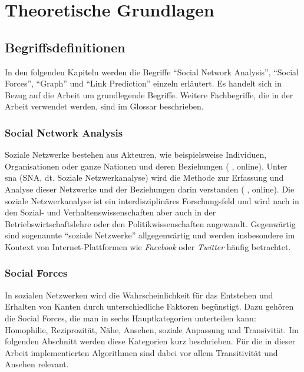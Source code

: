 \chapter{Theoretische Grundlagen}

\section{Begriffsdefinitionen}
In den folgenden Kapiteln werden die Begriffe ``Social Network Analysis'', ``Social Forces'', ``Graph'' und ``Link Prediction'' einzeln
erläutert. Es handelt sich in Bezug auf die Arbeit um grundlegende Begriffe. Weitere Fachbegriffe, die
in der Arbeit verwendet werden, sind im Glossar beschrieben.

\subsection{Social Network Analysis}
Soziale Netzwerke bestehen aus Akteuren, wie beispielsweise Individuen, Organisationen oder ganze Nationen und deren Beziehungen (\citeauthor{ulrike_baumol_soziale_2019} \citeyear{ulrike_baumol_soziale_2019}, online).
Unter \acl{sna} (SNA, dt. Soziale Netzwerkanalyse) wird die Methode zur Erfassung und Analyse dieser Netzwerke und der Beziehungen darin verstanden (\citeauthor{wikipedia_soziale_2019} \citeyear{wikipedia_soziale_2019}, online).
Die soziale Netzwerkanalyse ist ein interdisziplinäres Forschungsfeld und wird nach \cite{ulrike_baumol_soziale_2019} in den Sozial- und Verhaltenswissenschaften aber auch in der Betriebswirtschaftslehre oder den Politikwissenschaften angewandt.
Gegenwärtig sind sogenannte ``soziale Netzwerke'' allgegenwärtig und werden insbesondere im Kontext von Internet-Plattformen wie \textit{Facebook} oder \textit{Twitter} häufig betrachtet.

\subsection{Social Forces}
\label{socialforces}
In sozialen Netzwerken wird die Wahrscheinlichkeit für das Entstehen und Erhalten von Kanten durch unterschiedliche
Faktoren begünstigt. Dazu gehören die Social Forces, die man in sechs Hauptkategorien unterteilen kann: Homophilie,
Reziprozität, Nähe, Ansehen, soziale Anpassung und Transivität. Im folgenden Abschnitt werden diese Kategorien kurz
beschrieben. Für die in dieser Arbeit implementierten Algorithmen sind dabei vor allem Transitivität und Ansehen
relevant.

